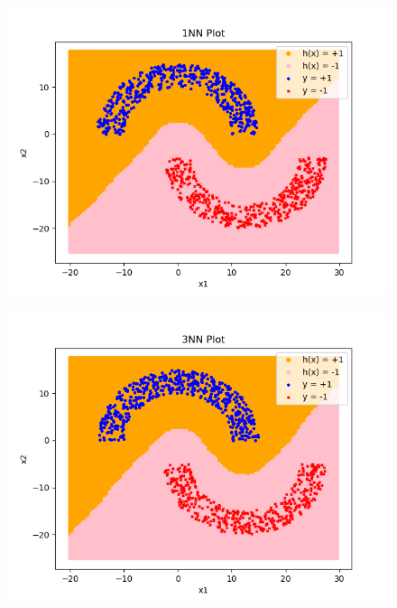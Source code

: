 \documentclass[11pt]{article}
\begin{document}
	\begin{figure}[htb] 
			{\includegraphics[height=8.5cm]{p6_4_1.png}}
	\end{figure}
	\begin{figure}[htb] 
			{\includegraphics[height=8.5cm]{p6_4_3.png}}
	\end{figure}

\newpage
\end{document}
